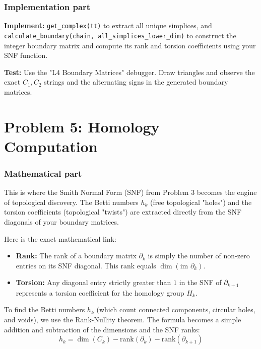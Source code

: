 \documentclass[11pt]{article}
\begin{document}
\subsubsection*{Implementation part}
\textbf{Implement:} \lstinline|get_complex(tt)| to extract all unique simplices, and \lstinline|calculate_boundary(chain, all_simplices_lower_dim)| to construct the integer boundary matrix and compute its rank and torsion coefficients using your SNF function.

\textbf{Test:} Use the "L4 Boundary Matrices" debugger. Draw triangles and observe the exact $C_1, C_2$ strings and the alternating signs in the generated boundary matrices.


\section*{Problem 5: Homology Computation}

\subsubsection*{Mathematical part}
This is where the Smith Normal Form (SNF) from Problem 3 becomes the engine of topological discovery. The Betti numbers $h_k$ (free topological "holes") and the torsion coefficients (topological "twists") are extracted directly from the SNF diagonals of your boundary matrices.

Here is the exact mathematical link:
\begin{itemize}
    \item \textbf{Rank:} The rank of a boundary matrix $\partial_k$ is simply the number of non-zero entries on its SNF diagonal. This rank equals $\dim(\text{im } \partial_k)$.
    \item \textbf{Torsion:} Any diagonal entry strictly greater than $1$ in the SNF of $\partial_{k+1}$ represents a torsion coefficient for the homology group $H_k$.
\end{itemize}

To find the Betti numbers $h_k$ (which count connected components, circular holes, and voids), we use the Rank-Nullity theorem. The formula becomes a simple addition and subtraction of the dimensions and the SNF ranks:
$$ h_k = \dim(C_k) - \text{rank}(\partial_k) - \text{rank}(\partial_{k+1}) $$
\end{document}
